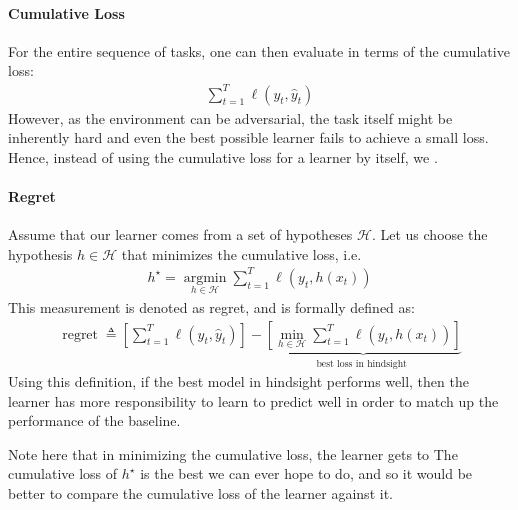 \documentclass{article}
\newcommand{\re}{\operatorname{regret}}
\begin{document}
\paragraph{Cumulative Loss}
For the entire sequence of tasks, one can then evaluate in terms of the cumulative loss:
\begin{align*}
\sum_{t=1}^{T} \ell\left(y_{t}, \hat{y}_{t}\right)
\end{align*}
However, as the environment can be adversarial, the task itself might be inherently hard and even the best possible learner fails to achieve a small loss. Hence, instead of using the cumulative loss for a learner by itself, we . 
\paragraph{Regret}
Assume that our learner comes from a set of hypotheses $\mathcal{H} .$ Let us choose the hypothesis $h \in \mathcal{H}$ that
minimizes the cumulative loss, i.e.
\begin{align}
h^{\star}=\underset{h \in \mathcal{H}}{\operatorname{argmin}} \sum_{t=1}^{T} \ell\left(y_{t}, h\left(x_{t}\right)\right)\label{eq:fdafe}
\end{align}
This measurement is denoted as regret, and is formally defined as:
\begin{align*}
\re \triangleq\left[\sum_{t=1}^{T} \ell\left(y_{t}, \hat{y}_{t}\right)\right]-\underbrace{\left[\min _{h \in \mathcal{H}} \sum_{t=1}^{T} \ell\left(y_{t}, h\left(x_{t}\right)\right)\right]}_{\text {best loss in hindsight }}
\end{align*}
Using this definition, if the best model in hindsight performs well, then the learner has more responsibility to learn to predict well in order to match up the performance of the baseline.
\begin{rema}
Note here that in minimizing the cumulative loss, the learner gets to  The cumulative loss of $h^{\star}$ is the best we can ever hope to do, and so it would be better to compare the cumulative loss of the learner against it.
\end{rema}
\end{document}
